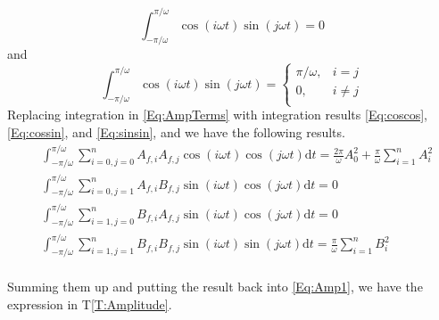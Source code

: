 \documentclass[12pt]{article}
\newcommand{\tref}[1]{T\ref{#1}}
\begin{document}
\begin{equation}\label{Eq:cossin}
	\int_{-\pi/\omega}^{\pi/\omega}\cos(i\omega t)\sin(j\omega t)=0
\end{equation}
and
\begin{equation}\label{Eq:sinsin}
	\int_{-\pi/\omega}^{\pi/\omega}\cos(i\omega t)\sin(j\omega t)=\begin{cases}
	\pi/\omega, &i=j\\
	0, &i\neq j\\
	\end{cases}
\end{equation}
Replacing integration in \autoref{Eq:AmpTerms} 
with integration results \autoref{Eq:coscos}, 
\autoref{Eq:cossin}, and \autoref{Eq:sinsin}, and we have the following results.
\begin{equation}\label{Eq:AmpTermsResult}
\begin{aligned}
&\int_{-\pi/\omega}^{\pi/\omega}\sum_{i=0,j=0}^{n}A_{f,i}A_{f,j}
\cos(i\omega t)\cos(j\omega t)\text{d} t
=\frac{2\pi}{\omega}A_0^2+\frac{\pi}{\omega}\sum_{i=1}^{n}A_i^2\\
&\int_{-\pi/\omega}^{\pi/\omega}\sum_{i=0,j=1}^{n}A_{f,i}B_{f,j}
\sin(i\omega t)\cos(j\omega t)\text{d} t
=0\\
&\int_{-\pi/\omega}^{\pi/\omega}\sum_{i=1,j=0}^{n}B_{f,i}A_{f,j}
\sin(i\omega t)\cos(j\omega t)\text{d} t
=0\\
&\int_{-\pi/\omega}^{\pi/\omega}\sum_{i=1,j=1}^{n}B_{f,i}B_{f,j}
\sin(i\omega t)\sin(j\omega t)\text{d} t
=\frac{\pi}{\omega}\sum_{i=1}^{n}B_i^2\\
\end{aligned}
\end{equation}

Summing them up and putting the result back into 
\autoref{Eq:Amp1}, we have the expression 
in \tref{T:Amplitude}.
\end{document}
